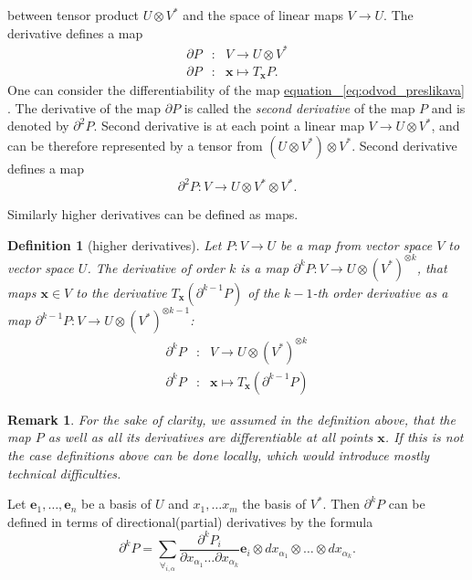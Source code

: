 \documentclass{article}
\makeatletter
\newcommand{\e}{\mathbf{e}}
\newcommand{\x}{\mathbf{x}}
\newcommand{\D}{\partial}
\newtheorem{definicija}{Definition}[section]
\newtheorem{opomba}{Remark}[section]
\let\originaleqref\eqref %
\renewcommand{\eqref}[1]{%
  \begingroup%
  \let\ref\@refstar%
  \hyperref[#1]{%
    equation%
    ~\originaleqref{#1}%
  }%
  \endgroup
}
\makeatother
\begin{document}
between tensor product $U\otimes V^*$ and the space of linear maps $V\to U$. The derivative defines a map
\begin{eqnarray}
  \label{eq:odvod_preslikava}
  \D P&:& V\to U\otimes V^*\\
  \D P&:& \x \mapsto T_\x P.
\end{eqnarray}
One can consider the differentiability of the map \eqref{eq:odvod_preslikava}.
The derivative of the map $\D P$ is called the \emph{second derivative}
of the map $P$ and is denoted by $\D^2P$. Second derivative is at each point a
linear map  $V\to U\otimes V^*$, and can be therefore 
represented by a tensor from $(U\otimes V^*)\otimes V^*$. Second derivative
defines a map 
$$\D^2 P:V\to U\otimes V^*\otimes V^*.$$ 

Similarly higher derivatives can be defined as maps.
\begin{definicija}[higher derivatives]
  Let $P:V\to U$ be a map from vector space $V$ to vector space $U$. 
The derivative of order $k$ is a map $\D^kP:V\to U\otimes(V^*)^{\otimes k}$,
that maps $\x\in V$ to the derivative  $T_\x(\D^{k-1}P)$ of the $k-1$-th order
derivative as a map $\D^{k-1}P: V\to U\otimes (V^*)^{\otimes k-1}$:
  \begin{eqnarray}\label{eq:partial}
    \label{eq:visji_odvod}
    \D^kP&:&V\to U\otimes (V^*)^{\otimes k}\\
    \D^kP&:&\x\mapsto T_\x\left( \D^{k-1}P \right)
  \end{eqnarray}
\end{definicija} 
\begin{opomba}
  For the sake of clarity, we assumed in the definition above, that the map $P$ as well as all its
  derivatives are differentiable at all points $\x$. If this is not the case
  definitions above can be done locally, which would introduce mostly technical difficulties.
\end{opomba}
Let $\e_1,\ldots,\e_n$ be a basis of $U$ and $x_1,\ldots x_m$ the basis of
$V^*$. Then $\D^kP$  can be defined in terms of
directional(partial) derivatives by the formula
\begin{equation}\label{eq:d}
	\partial^kP=\sum_{\forall_{i,\alpha}}\frac{\partial^k P_i}{\partial
	    x_{\alpha_1}\ldots \partial x_{\alpha_k}}\e_i\otimes
	  dx_{\alpha_1}\otimes\ldots \otimes dx_{\alpha_k}.
\end{equation}
\end{document}
